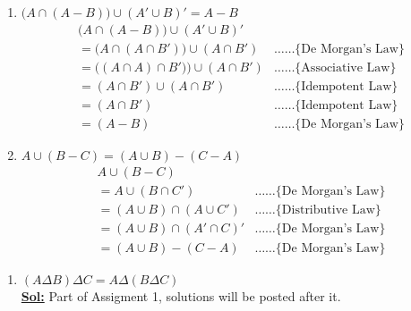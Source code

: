 \documentclass[xcolor=svgnames]{beamer}
\begin{document}
\begin{frame}
\begin{enumerate}\addtocounter{enumi}{1}
    \item $\big(A \cap (A - B )\big)\cup(A' \cup B)'= A - B$ 
    \begin{align*}
        & \big(A \cap (A - B )\big)\cup(A' \cup B)' &  \\
        &= \big(A \cap (A \cap B' )\big)\cup(A \cap B') & \ldots \ldots \{\text{De Morgan's Law}\}\\
        &= \big((A \cap A) \cap B' )\big)\cup(A \cap B') & \ldots \ldots \{\text{Associative Law}\} \\
        &= (A \cap B')\cup(A \cap B') & \ldots \ldots \{\text{Idempotent Law}\}\\
        &= (A \cap B') & \ldots \ldots \{\text{Idempotent Law}\} \\ 
        &= (A - B) & \ldots \ldots \{\text{De Morgan's Law}\}
    \end{align*}    
    \item $A \cup (B - C) = (A \cup B) - (C - A)$
    \begin{align*}
        &A \cup (B - C) \\
        &= A \cup (B \cap C') & \ldots \ldots \{\text{De Morgan's Law}\} \\
        &= (A \cup B) \cap (A \cup C') & \ldots \ldots \{\text{Distributive Law}\} \\
        &= (A \cup B) \cap (A' \cap C)' & \ldots \ldots \{\text{De Morgan's Law}\} \\ 
        &= (A \cup B) - (C - A) & \ldots \ldots \{\text{De Morgan's Law}\}
    \end{align*}
\end{enumerate}
\end{frame}
\begin{frame}
\begin{enumerate}\addtocounter{enumi}{3}
\item $(A \Delta B) \Delta C = A \Delta (B \Delta C) $ \\
\textbf{\underline{Sol:}} Part of Assigment 1, solutions will be posted after it.
\end{enumerate}
\end{frame}
\end{document}
